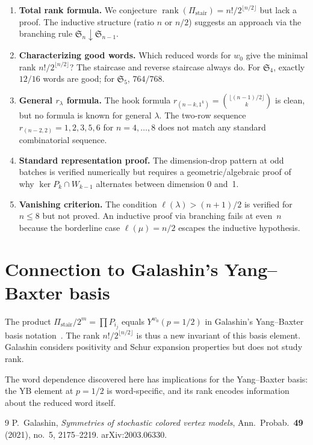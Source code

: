 \documentclass[11pt]{article}
\theoremstyle{definition}
\theoremstyle{remark}
\newcommand{\Sym}{\mathfrak{S}}
\begin{document}
\begin{enumerate}
  \item \textbf{Total rank formula.} We conjecture
    $\operatorname{rank}(\Pi_{\mathrm{stair}}) = n!/2^{\lfloor n/2 \rfloor}$ but
    lack a proof. The inductive structure (ratio $n$ or $n/2$) suggests
    an approach via the branching rule $\Sym_n \downarrow \Sym_{n-1}$.

  \item \textbf{Characterizing good words.} Which reduced words for $w_0$ give the
    minimal rank $n!/2^{\lfloor n/2 \rfloor}$? The staircase and reverse staircase
    always do. For $\Sym_4$, exactly $12/16$ words are good; for $\Sym_5$, $764/768$.

  \item \textbf{General $r_\lambda$ formula.} The hook formula
    $r_{(n-k,1^k)} = \binom{\lfloor(n-1)/2\rfloor}{k}$ is clean, but no formula
    is known for general $\lambda$. The two-row sequence
    $r_{(n-2,2)} = 1, 2, 3, 5, 6$ for $n = 4, \dots, 8$ does not match any standard
    combinatorial sequence.

  \item \textbf{Standard representation proof.} The dimension-drop pattern at odd
    batches is verified numerically but requires a geometric/algebraic proof of why
    $\ker P_k \cap W_{k-1}$ alternates between dimension 0 and~1.

  \item \textbf{Vanishing criterion.} The condition $\ell(\lambda) > (n+1)/2$ is verified
    for $n \le 8$ but not proved. An inductive proof via branching fails at even~$n$
    because the borderline case $\ell(\mu) = n/2$ escapes the inductive hypothesis.
\end{enumerate}


\section{Connection to Galashin's Yang--Baxter basis}

The product $\Pi_{\mathrm{stair}}/2^m = \prod P_{i_j}$ equals $Y^{w_0}(p{=}1/2)$
in Galashin's Yang--Baxter basis notation~\cite{Galashin2020}.
The rank $n!/2^{\lfloor n/2 \rfloor}$ is thus a new invariant of this basis element.
Galashin considers positivity and Schur expansion properties but does not study rank.

The word dependence discovered here has implications for the Yang--Baxter basis:
the YB element at $p = 1/2$ is word-specific, and its rank encodes information about
the reduced word itself.

\begin{thebibliography}{9}
P.~Galashin, \emph{Symmetries of stochastic colored vertex models},
Ann.\ Probab.\ \textbf{49} (2021), no.~5, 2175--2219. arXiv:2003.06330.
\end{thebibliography}
\end{document}
